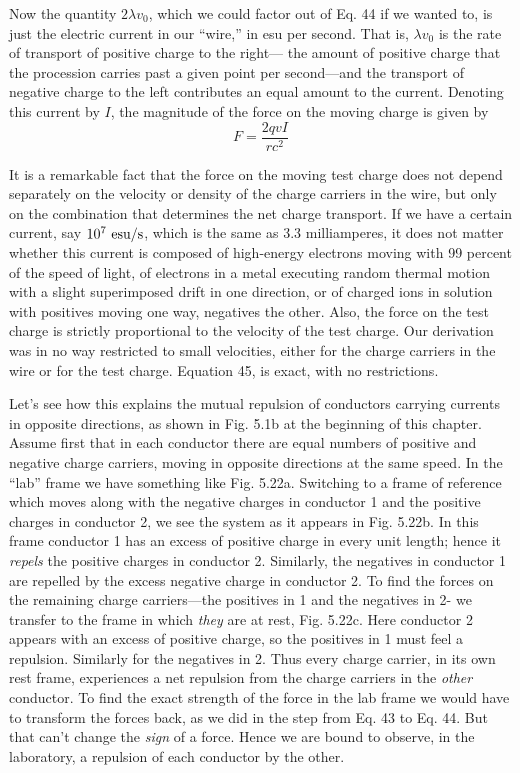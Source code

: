 
Now the quantity $2\lambda v_0$, which we could factor out of Eq. 44 if we
wanted to, is just the electric current in our ``wire,'' in esu per second.
That is, $\lambda v_0$ is the rate of transport of positive charge to the right---
the amount of positive charge that the procession carries past a given
point per second---and the transport of negative charge to the left
contributes an equal amount to the current. Denoting this current
by $I$, the magnitude of the force on the moving charge is given by
\begin{equation}
  F = \frac{2qvI}{rc^2}
\end{equation}

It is a remarkable fact that the force on the moving test charge
does not depend separately on the velocity or density of the charge
carriers in the wire, but only on the combination that determines the
net charge transport. If we have a certain current, say $10^7\ \textup{esu}/\textup{s}$,
which is the same as 3.3 milliamperes, it does not matter whether this
current is composed of high-energy electrons moving with 99 percent
of the speed of light, of electrons in a metal executing random thermal
motion with a slight superimposed drift in one direction, or of
charged ions in solution with positives moving one way, negatives
the other. Also, the force on the test charge is strictly proportional
to the velocity of the test charge. Our derivation was in no way
restricted to small velocities, either for the charge carriers in the wire
or for the test charge. Equation 45, is exact, with no restrictions.

Let's see how this explains the mutual repulsion of conductors
carrying currents in opposite directions, as shown in Fig. 5.1b at the
beginning of this chapter. Assume first that in each conductor there
are equal numbers of positive and negative charge carriers, moving
in opposite directions at the same speed. In the ``lab'' frame we have
something like Fig. 5.22a. Switching to a frame of reference which
moves along with the negative charges in conductor 1 and the positive
charges in conductor 2, we see the system as it appears in
Fig. 5.22b. In this frame conductor 1 has an excess of positive charge
in every unit length; hence it \emph{repels} the positive charges in conductor
2. Similarly, the negatives in conductor 1 are repelled by the
excess negative charge in conductor 2. To find the forces on the remaining
charge carriers---the positives in 1 and the negatives in 2-
we transfer to the frame in which \emph{they} are at rest, Fig. 5.22c. Here
conductor 2 appears with an excess of positive charge, so the positives
in 1 must feel a repulsion. Similarly for the negatives in 2.
Thus every charge carrier, in its own rest frame, experiences a net
repulsion from the charge carriers in the \emph{other} conductor. To find
the exact strength of the force in the lab frame we would have to
transform the forces back, as we did in the step from Eq. 43 to Eq. 44.
But that can't change the \emph{sign} of a force. Hence we are bound to
observe, in the laboratory, a repulsion of each conductor by the
other.

